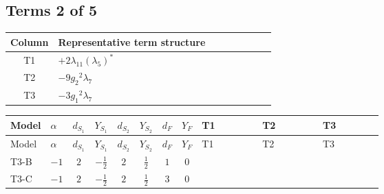 \documentclass[8pt]{article}
\begin{document}
\begin{landscape}
\subsection*{Terms 2 of 5}
\begin{center}
\begin{tabular}{@{}c >{\raggedright\arraybackslash}p{0.82\linewidth}@{}}
\toprule
Column & Representative term structure \\
\midrule
T1 & \(\displaystyle +2 {\lambda_{11}} \left({\lambda_5}\right)^{*}\) \\
\midrule
T2 & \(\displaystyle -9 {g_2}^2 {\lambda_7}\) \\
\midrule
T3 & \(\displaystyle -3 {g_1}^2 {\lambda_7}\) \\
\midrule
\bottomrule
\end{tabular}
\end{center}
\smallskip
\tiny
\begin{longtable}{@{}llcccccc >{\raggedright\arraybackslash}p{0.21\linewidth} >{\raggedright\arraybackslash}p{0.21\linewidth} >{\raggedright\arraybackslash}p{0.21\linewidth}@{}}
\toprule
Model & $\alpha$ & $d_{S_1}$ & $Y_{S_1}$ & $d_{S_2}$ & $Y_{S_2}$ & $d_F$ & $Y_F$ & T1 & T2 & T3 \\
\midrule
\endfirsthead
\toprule
Model & $\alpha$ & $d_{S_1}$ & $Y_{S_1}$ & $d_{S_2}$ & $Y_{S_2}$ & $d_F$ & $Y_F$ & T1 & T2 & T3 \\
\midrule
\endhead
T3-B & $-1$ & $2$ & $-\frac{1}{2}$ & $2$ & $\frac{1}{2}$ & $1$ & $0$ & \scriptsize\adjustbox{max width=\linewidth}{$\begin{gathered} +2 {\lambda_{11}} \left({\lambda_5}\right)^{*}\end{gathered}$} & \scriptsize\adjustbox{max width=\linewidth}{$\begin{gathered} -9 {g_2}^2 {\lambda_7}\end{gathered}$} & \scriptsize\adjustbox{max width=\linewidth}{$\begin{gathered} -3 {g_1}^2 {\lambda_7}\end{gathered}$} \\
\midrule
T3-C & $-1$ & $2$ & $-\frac{1}{2}$ & $2$ & $\frac{1}{2}$ & $3$ & $0$ & \scriptsize\adjustbox{max width=\linewidth}{$\begin{gathered} +2 {\lambda_{11}} \left({\lambda_5}\right)^{*}\end{gathered}$} & \scriptsize\adjustbox{max width=\linewidth}{$\begin{gathered} -9 {g_2}^2 {\lambda_7}\end{gathered}$} & \scriptsize\adjustbox{max width=\linewidth}{$\begin{gathered} -3 {g_1}^2 {\lambda_7}\end{gathered}$} \\

\end{longtable}
\end{landscape}
\end{document}
